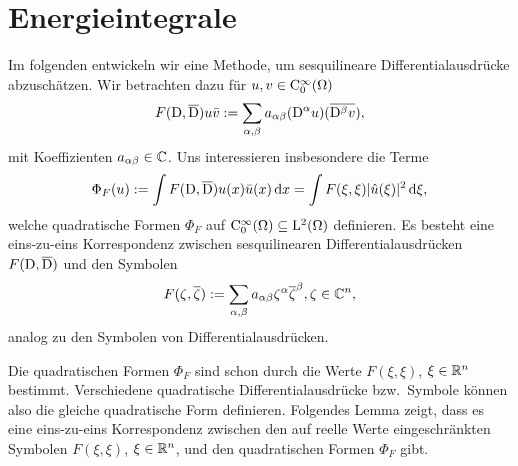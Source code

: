 \section{Energieintegrale}

Im folgenden entwickeln wir eine Methode, um sesquilineare Differentialausdrücke abzuschätzen.
Wir betrachten dazu für $u,v\in\mathrm C_0^\infty(\Omega)$
\begin{equation}
F(\mathrm D,\overline{\mathrm D})u\bar{v}
:=\sum_{\alpha,\beta}a_{\alpha\beta}(\mathrm D^\alpha u)(\overline{\mathrm D^\beta v}),
\end{equation}
mit Koeffizienten $a_{\alpha\beta}\in\mathbb C$. Uns interessieren insbesondere die Terme
\begin{equation}\label{eq:2:qf}
\Phi_F(u):=\int F(\mathrm D,\overline{\mathrm D})u(x)\bar{u}(x)\,\mathrm d x
=\int F(\xi,\xi)\lvert\hat{u}(\xi)\rvert^2\,\mathrm d \xi,
\end{equation}
welche quadratische Formen $\Phi_F$ auf $\mathrm C^\infty_0(\Omega)\subseteq \mathrm L^2(\Omega)$
definieren.
Es besteht eine eins-zu-eins Korrespondenz
zwischen sesquilinearen Differentialausdrücken $F(\mathrm D,\overline{\mathrm D})$
und den Symbolen
\begin{equation}
F(\zeta,\overline{\zeta}):=\sum_{\alpha,\beta}a_{\alpha\beta}\zeta^\alpha\overline{\zeta}^\beta, \zeta\in\mathbb C^n,
\end{equation}
analog zu den Symbolen von Differentialausdrücken.

Die quadratischen Formen $\Phi_F$
sind schon durch die Werte $F(\xi,\xi)$, $\xi\in\mathbb R^n$ bestimmt.
Verschiedene quadratische Differentialausdrücke bzw.~Symbole
können also die gleiche quadratische Form definieren.
Folgendes Lemma zeigt, dass es eine eins-zu-eins
Korrespondenz zwischen den auf reelle Werte eingeschränkten
Symbolen $F(\xi,\xi)$, $\xi\in\mathbb R^n$,
und den quadratischen Formen $\Phi_F$ gibt.

